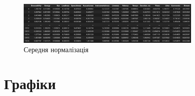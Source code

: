 \documentclass{article}
\begin{document}
\begin{figure}
    \centering
    \includegraphics[width=0.8\textwidth]{img/meannorm.png} %
    \caption{Середня нормалізація} %
    \label{fig:meannorm} %
\end{figure}

\section{Графіки}
\end{document}
